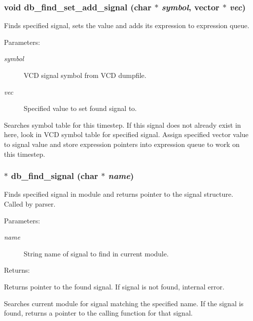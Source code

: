 \subsubsection{\setlength{\rightskip}{0pt plus 5cm}void db\_\-find\_\-set\_\-add\_\-signal (char $\ast$ {\em symbol}, {\bf vector} $\ast$ {\em vec})}\label{db_8h_a11}


Finds specified signal, sets the value and adds its expression to expression queue.

\begin{Desc}
\item[Parameters: ]\par
\begin{description}
\item[{\em 
symbol}]VCD signal symbol from VCD dumpfile. \item[{\em 
vec}]Specified value to set found signal to.\end{description}
\end{Desc}
Searches symbol table for this timestep. If this signal does not already exist in here, look in VCD symbol table for specified signal. Assign specified vector value to signal value and store expression pointers into expression queue to work on this timestep. 
\subsubsection{$\ast$ db\_\-find\_\-signal (char $\ast$ {\em name})}\label{db_8h_a5}


Finds specified signal in module and returns pointer to the signal structure. Called by parser.

\begin{Desc}
\item[Parameters: ]\par
\begin{description}
\item[{\em 
name}]String name of signal to find in current module.\end{description}
\end{Desc}
\begin{Desc}
\item[Returns: ]\par
Returns pointer to the found signal. If signal is not found, internal error.\end{Desc}
Searches current module for signal matching the specified name. If the signal is found, returns a pointer to the calling function for that signal. 
